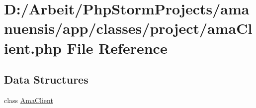 \hypertarget{ama_client_8php}{}\section{D\+:/\+Arbeit/\+Php\+Storm\+Projects/amanuensis/app/classes/project/ama\+Client.php File Reference}
\label{ama_client_8php}
\subsection*{Data Structures}
\begin{DoxyCompactItemize}
\item 
class \hyperlink{class_ama_client}{Ama\+Client}
\end{DoxyCompactItemize}
